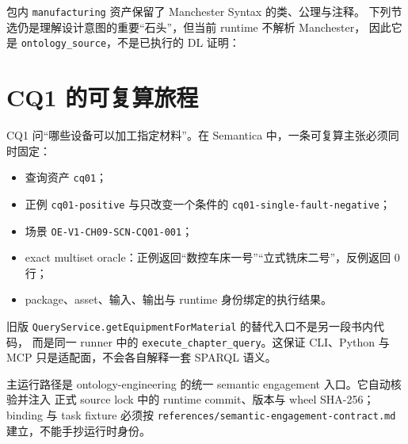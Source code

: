 包内 \texttt{manufacturing} 资产保留了 Manchester Syntax 的类、公理与注释。
下列节选仍是理解设计意图的重要“石头”，但当前 runtime 不解析 Manchester，
因此它是 \texttt{ontology\_source}，不是已执行的 DL 证明：



\section{CQ1 的可复算旅程}

CQ1 问“哪些设备可以加工指定材料”。在 Semantica 中，一条可复算主张必须同时固定：

\begin{itemize}
\item 查询资产 \texttt{cq01}；
\item 正例 \texttt{cq01-positive} 与只改变一个条件的
      \texttt{cq01-single-fault-negative}；
\item 场景 \texttt{OE-V1-CH09-SCN-CQ01-001}；
\item exact multiset oracle：正例返回“数控车床一号”“立式铣床二号”，反例返回 0 行；
\item package、asset、输入、输出与 runtime 身份绑定的执行结果。
\end{itemize}

旧版 \texttt{QueryService.getEquipmentForMaterial} 的替代入口不是另一段书内代码，
而是同一 runner 中的 \texttt{execute\_chapter\_query}。这保证 CLI、Python 与 MCP
只是适配面，不会各自解释一套 SPARQL 语义。

主运行路径是 ontology-engineering 的统一 semantic engagement 入口。它自动核验并注入
正式 source lock 中的 runtime commit、版本与 wheel SHA-256；binding 与 task fixture
必须按 \texttt{references/semantic-engagement-contract.md} 建立，不能手抄运行时身份。

\begin{codebox}
\end{codebox}

